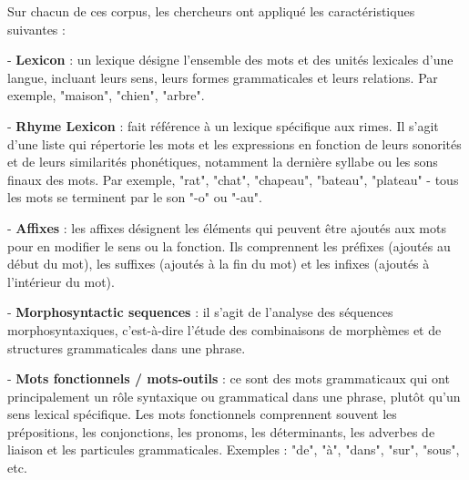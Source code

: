 \vspace{\baselineskip}
\hspace{0,5cm}Sur chacun de ces corpus, les chercheurs ont appliqué les caractéristiques
suivantes :

\hspace{1cm}- \textbf{Lexicon} : un lexique désigne l'ensemble des mots et des unités lexicales d'une
langue, incluant leurs sens, leurs formes grammaticales et leurs relations. Par
exemple, "maison", "chien", "arbre".

\hspace{1cm}- \textbf{Rhyme Lexicon} : fait référence à un lexique spécifique aux rimes. Il s'agit
d'une liste qui répertorie les mots et les expressions en fonction de leurs
sonorités et de leurs similarités phonétiques, notamment la dernière syllabe ou
les sons finaux des mots. Par exemple, "rat", "chat", "chapeau", "bateau",
"plateau" - tous les mots se terminent par le son "-o" ou "-au".

\hspace{1cm}- \textbf{Affixes} : les affixes désignent les éléments qui peuvent être ajoutés aux mots
pour en modifier le sens ou la fonction. Ils comprennent les préfixes (ajoutés
au début du mot), les suffixes (ajoutés à la fin du mot) et les infixes (ajoutés
à l'intérieur du mot).

\hspace{1cm}- \textbf{Morphosyntactic sequences} : il s'agit de l'analyse des séquences
morphosyntaxiques, c'est-à-dire l'étude des combinaisons de morphèmes et de
structures grammaticales dans une phrase.

\hspace{1cm}- \textbf{Mots fonctionnels / mots-outils} : ce sont des mots grammaticaux
qui ont principalement un rôle syntaxique ou grammatical dans une phrase, plutôt
qu'un sens lexical spécifique. Les mots fonctionnels comprennent souvent les
prépositions, les conjonctions, les pronoms, les déterminants, les adverbes de
liaison et les particules grammaticales. Exemples : "de", "à", "dans", "sur",
"sous", etc.